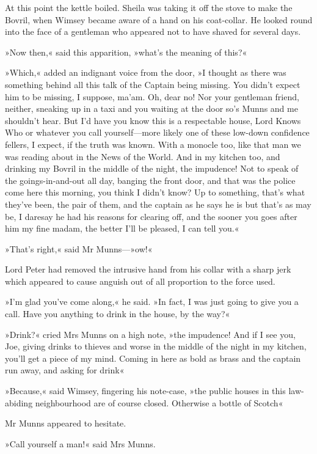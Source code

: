 At this point the kettle boiled. Sheila was taking it off the stove to make the Bovril, when Wimsey became aware of a hand on his coat-collar. He looked round into the face of a gentleman who appeared not to have shaved for several days.

»Now then,« said this apparition, »what's the meaning of this?«

»Which,« added an indignant voice from the door, »I thought as there was something behind all this talk of the Captain being missing. You didn't expect him to be missing, I suppose, ma'am. Oh, dear no! Nor your gentleman friend, neither, sneaking up in a taxi and you waiting at the door so's Munns and me shouldn't hear. But I'd have you know this is a respectable house, Lord Knows Who or whatever you call yourself\allowbreak---\allowbreak more likely one of these low-down confidence fellers, I expect, if the truth was known. With a monocle too, like that man we was reading about in the News of the World. And in my kitchen too, and drinking my Bovril in the middle of the night, the impudence! Not to speak of the goings-in-and-out all day, banging the front door, and that was the police come here this morning, you think I didn't know? Up to something, that's what they've been, the pair of them, and the captain as he says he is but that's as may be, I daresay he had his reasons for clearing off, and the sooner you goes after him my fine madam, the better I'll be pleased, I can tell you.«

»That's right,« said Mr Munns---»ow!«

Lord Peter had removed the intrusive hand from his collar with a sharp jerk which appeared to cause anguish out of all proportion to the force used.

»I'm glad you've come along,« he said. »In fact, I was just going to give you a call. Have you anything to drink in the house, by the way?«

»Drink?« cried Mrs Munns on a high note, »the impudence! And if I see you, Joe, giving drinks to thieves and worse in the middle of the night in my kitchen, you'll get a piece of my mind. Coming in here as bold as brass and the captain run away, and asking for drink\longdash«

»Because,« said Wimsey, fingering his note-case, »the public houses in this law-abiding neighbourhood are of course closed. Otherwise a bottle of Scotch\longdash«

Mr Munns appeared to hesitate.

»Call yourself a man!« said Mrs Munns.

